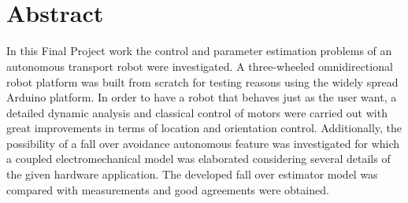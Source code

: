 \documentclass[12pt,english,twoside]{article}
\begin{document}
\thispagestyle{empty}
$~$
\newpage

\renewcommand{\contentsname}{Contents}
\renewcommand{\cftsecleader}{\cftdotfill{\cftdotsep}}
\tableofcontents
{} %
\thispagestyle{empty}
\newpage

\thispagestyle{empty}
$~$
\newpage

\section*{Abstract}
In this Final Project work the control and parameter estimation problems of an autonomous transport robot were investigated. A three-wheeled omnidirectional robot platform was built from scratch for testing reasons using the widely spread Arduino platform. In order to have a robot that behaves just as the user want, a detailed dynamic analysis and classical control of motors were carried out with great improvements in terms of location and orientation control. Additionally, the possibility of a fall over avoidance autonomous feature was investigated for which a coupled electromechanical model was elaborated considering several details of the given hardware application. The developed fall over estimator model was compared with measurements and good agreements were obtained.
\newpage

\thispagestyle{empty}
$~$
\newpage
\end{document}
